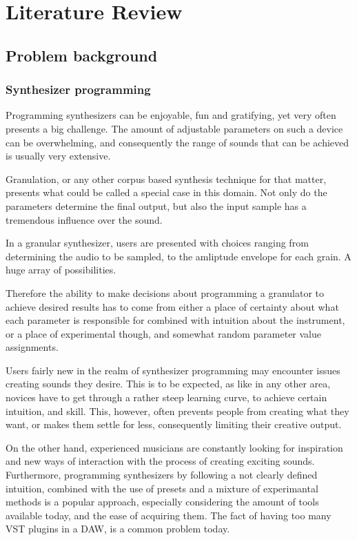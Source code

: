\chapter{Literature Review}
\label{chap:lit}

\section{Problem background}

\subsection{Synthesizer programming}

Programming synthesizers can be enjoyable, fun and gratifying, yet
very often presents a big challenge. The amount of adjustable
parameters on such a device can be overwhelming, and consequently the
range of sounds that can be achieved is usually very extensive.

Granulation, or any other corpus based synthesis technique for that
matter, presents what could be called a special case in this
domain. Not only do the parameters determine the final output, but
also the input sample has a tremendous influence over the sound.

In a granular synthesizer, users are presented with choices ranging
from determining the audio to be sampled, to the amliptude envelope
for each grain. A huge array of possibilities.

Therefore the ability to make decisions about programming a granulator
to achieve desired results has to come from either a place of
certainty about what each parameter is responsible for combined with
intuition about the instrument, or a place of experimental though, and
somewhat random parameter value assignments.

Users fairly new in the realm of synthesizer programming may encounter
issues creating sounds they desire. This is to be expected, as like in
any other area, novices have to get through a rather steep learning
curve, to achieve certain intuition, and skill. This, however, often
prevents people from creating what they want, or makes them settle for
less, consequently limiting their creative output.

On the other hand, experienced musicians are constantly looking for
inspiration and new ways of interaction with the process of creating
exciting sounds\cite{herbert_manifesto_2011}. Furthermore, programming
synthesizers by following a not clearly defined intuition, combined
with the use of presets and a mixture of experimantal methods is a
popular approach\cite{noauthor_oneohtrix_2016}, especially considering
the amount of tools available today, and the ease of acquiring
them. The fact of having too many VST plugins in a DAW, is a common
problem today.

